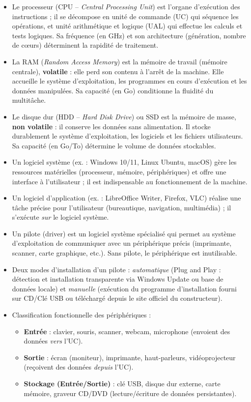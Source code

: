 \documentclass[11pt]{article}
\newcommand{\cle}[1]{{\popxbold\color{popdark}#1}}
\newcounter{popsec}
\newcounter{popsub}
\newcommand{\courssub}[1]{%
  \stepcounter{popsub}%
  \par\vspace{9pt}\noindent{\popxbold\fontsize{11.5}{13}\selectfont\color{popink}{\color{poporange}\thepopsec.\thepopsub}\hspace{6pt}#1}\par\nopagebreak\vspace{4pt}
}
\begin{document}
\courssub{Ressources à mobiliser}

\begin{aretenir}
\begin{itemize}
\item Le \cle{processeur} (CPU -- \emph{Central Processing Unit}) est l'organe d'exécution des instructions ; il se décompose en \cle{unité de commande} (UC) qui séquence les opérations, et \cle{unité arithmétique et logique} (UAL) qui effectue les calculs et tests logiques. Sa fréquence (en GHz) et son architecture (génération, nombre de cœurs) déterminent la rapidité de traitement.
\item La \cle{RAM} (\emph{Random Access Memory}) est la mémoire de travail (mémoire centrale), \textbf{volatile} : elle perd son contenu à l'arrêt de la machine. Elle accueille le système d'exploitation, les programmes en cours d'exécution et les données manipulées. Sa capacité (en Go) conditionne la fluidité du multitâche.
\item Le \cle{disque dur} (HDD -- \emph{Hard Disk Drive}) ou SSD est la mémoire de masse, \textbf{non volatile} : il conserve les données sans alimentation. Il stocke durablement le système d'exploitation, les logiciels et les fichiers utilisateurs. Sa capacité (en Go/To) détermine le volume de données stockables.
\item Un \cle{logiciel système} (ex. : Windows 10/11, Linux Ubuntu, macOS) gère les ressources matérielles (processeur, mémoire, périphériques) et offre une interface à l'utilisateur ; il est indispensable au fonctionnement de la machine.
\item Un \cle{logiciel d'application} (ex. : LibreOffice Writer, Firefox, VLC) réalise une tâche précise pour l'utilisateur (bureautique, navigation, multimédia) ; il s'exécute \emph{sur} le logiciel système.
\item Un \cle{pilote} (driver) est un logiciel système spécialisé qui permet au système d'exploitation de communiquer avec un périphérique précis (imprimante, scanner, carte graphique, etc.). Sans pilote, le périphérique est inutilisable.
\item Deux modes d'installation d'un pilote : \emph{automatique} (Plug and Play : détection et installation transparente via Windows Update ou base de données locale) et \emph{manuelle} (exécution du programme d'installation fourni sur CD/Clé USB ou téléchargé depuis le site officiel du constructeur).
\item Classification fonctionnelle des périphériques :
  \begin{itemize}
  \item \textbf{Entrée} : clavier, souris, scanner, webcam, microphone (envoient des données \emph{vers} l'UC).
  \item \textbf{Sortie} : écran (moniteur), imprimante, haut-parleurs, vidéoprojecteur (reçoivent des données \emph{depuis} l'UC).
  \item \textbf{Stockage (Entrée/Sortie)} : clé USB, disque dur externe, carte mémoire, graveur CD/DVD (lecture/écriture de données persistantes).
  \end{itemize}
\end{itemize}
\end{aretenir}
\end{document}

